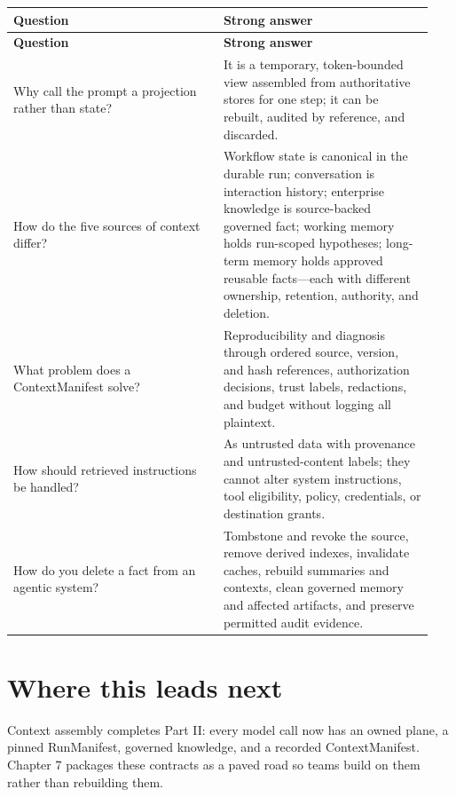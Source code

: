 \BookTableStart
\small
\begin{longtable}{@{}Y{0.4700\linewidth}Y{0.4700\linewidth}@{}}
\color{white}\bfseries \textbf{Question} & \color{white}\bfseries \textbf{Strong answer} \\
\endfirsthead
{}
\color{white}\bfseries \textbf{Question} & \color{white}\bfseries \textbf{Strong answer} \\
\endhead
Why call the prompt a projection rather than state? & It is a temporary, token-bounded view assembled from authoritative stores for one step; it can be rebuilt, audited by reference, and discarded. \\
How do the five sources of context differ? & Workflow state is canonical in the durable run; conversation is interaction history; enterprise knowledge is source-backed governed fact; working memory holds run-scoped hypotheses; long-term memory holds approved reusable facts—each with different ownership, retention, authority, and deletion. \\
What problem does a ContextManifest solve? & Reproducibility and diagnosis through ordered source, version, and hash references, authorization decisions, trust labels, redactions, and budget without logging all plaintext. \\
How should retrieved instructions be handled? & As untrusted data with provenance and untrusted-content labels; they cannot alter system instructions, tool eligibility, policy, credentials, or destination grants. \\
How do you delete a fact from an agentic system? & Tombstone and revoke the source, remove derived indexes, invalidate caches, rebuild summaries and contexts, clean governed memory and affected artifacts, and preserve permitted audit evidence. \\
\end{longtable}
\BookTableEnd

\section{Where this leads next}

Context assembly completes Part II: every model call now has an owned plane, a pinned RunManifest, governed knowledge, and a recorded ContextManifest. Chapter 7 packages these contracts as a paved road so teams build on them rather than rebuilding them.\par

